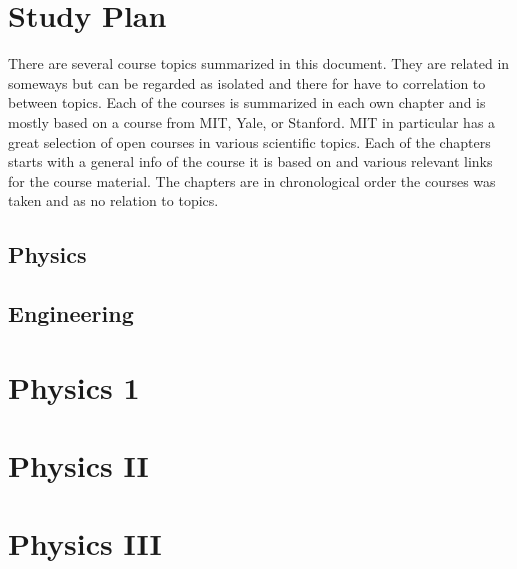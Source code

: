 \documentclass{book}
\author{Anton Augustsson}
\begin{document}
\maketitle
\newpage
\tableofcontents
\newpage



\chapter{Study Plan}
There are several course topics summarized in this document.
They are related in someways but can be regarded as isolated and there for have to correlation to between topics.
Each of the courses is summarized in each own chapter and is mostly based on a course from MIT, Yale, or Stanford.
MIT in particular has a great selection of open courses in various scientific topics. Each of the chapters starts
with a general info of the course it is based on and various relevant links for the course material.
The chapters are in chronological order the courses was taken and as no relation to topics.
\newpage

\section{Physics}
\resizebox{0.9\textwidth}{!}{} \newpage

\section{Engineering}
\resizebox{0.9\textwidth}{!}{} \newpage
  

\newcommand{\pathPHY}{chapters}

\chapter{Physics 1}
\newcommand{\pathPI}{\pathPHY/Physics-I}  \newpage
\chapter{Physics II}
\newcommand{\pathPII}{\pathPHY/Physics-II}  \newpage
\chapter{Physics III}
\newcommand{\pathPIII}{\pathPHY/Physics-III}  \newpage
\end{document}
